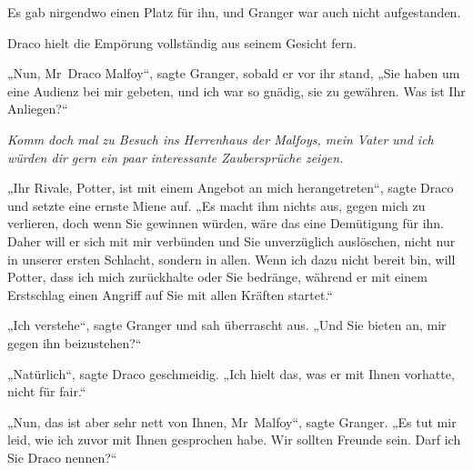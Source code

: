 Es gab nirgendwo einen Platz für ihn, und Granger war auch nicht aufgestanden.

Draco hielt die Empörung vollständig aus seinem Gesicht fern.

„Nun, Mr~Draco Malfoy“, sagte Granger, sobald er vor ihr stand,
„Sie haben um eine Audienz bei mir gebeten, und ich war so gnädig, sie zu gewähren. Was ist Ihr Anliegen?“

\emph{Komm doch mal zu Besuch ins Herrenhaus der Malfoys, mein Vater und ich würden dir gern ein paar interessante Zaubersprüche zeigen.}

„Ihr Rivale, Potter, ist mit einem Angebot an mich herangetreten“, sagte Draco und setzte eine ernste Miene auf.
„Es macht ihm nichts aus, gegen mich zu verlieren, doch wenn Sie gewinnen würden, wäre das eine Demütigung für ihn. Daher will er sich mit mir verbünden und Sie unverzüglich auslöschen, nicht nur in unserer ersten Schlacht, sondern in allen. Wenn ich dazu nicht bereit bin, will Potter, dass ich mich zurückhalte oder Sie bedränge, während er mit einem Erstschlag einen Angriff auf Sie mit allen Kräften startet.“

„Ich verstehe“, sagte Granger und sah überrascht aus.
„Und Sie bieten an, mir gegen ihn beizustehen?“

„Natürlich“, sagte Draco geschmeidig.
„Ich hielt das, was er mit Ihnen vorhatte, nicht für fair.“

„Nun, das ist aber sehr nett von Ihnen, Mr~Malfoy“, sagte Granger.
„Es tut mir leid, wie ich zuvor mit Ihnen gesprochen habe. Wir sollten Freunde sein. Darf ich Sie Draco nennen?“

